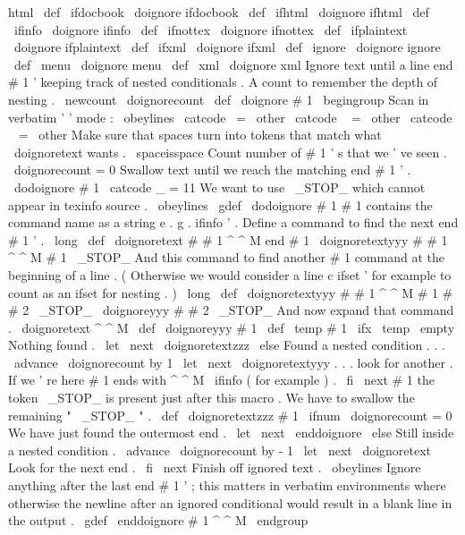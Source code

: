 {{{{{{
html
}
}
\
def
\
ifdocbook
{
\
doignore
{
ifdocbook
}
}
\
def
\
ifhtml
{
\
doignore
{
ifhtml
}
}
\
def
\
ifinfo
{
\
doignore
{
ifinfo
}
}
\
def
\
ifnottex
{
\
doignore
{
ifnottex
}
}
\
def
\
ifplaintext
{
\
doignore
{
ifplaintext
}
}
\
def
\
ifxml
{
\
doignore
{
ifxml
}
}
\
def
\
ignore
{
\
doignore
{
ignore
}
}
\
def
\
menu
{
\
doignore
{
menu
}
}
\
def
\
xml
{
\
doignore
{
xml
}
}
%
Ignore
text
until
a
line
end
#
1
'
keeping
track
of
nested
conditionals
.
%
%
A
count
to
remember
the
depth
of
nesting
.
\
newcount
\
doignorecount
\
def
\
doignore
#
1
{
\
begingroup
%
Scan
in
verbatim
'
'
mode
:
\
obeylines
\
catcode
\
=
\
other
\
catcode
\
{
=
\
other
\
catcode
\
}
=
\
other
%
%
Make
sure
that
spaces
turn
into
tokens
that
match
what
\
doignoretext
wants
.
\
spaceisspace
%
%
Count
number
of
#
1
'
s
that
we
'
ve
seen
.
\
doignorecount
=
0
%
%
Swallow
text
until
we
reach
the
matching
end
#
1
'
.
\
dodoignore
{
#
1
}
%
}
{
\
catcode
_
=
11
%
We
want
to
use
\
_STOP_
which
cannot
appear
in
texinfo
source
.
\
obeylines
%
%
\
gdef
\
dodoignore
#
1
{
%
%
#
1
contains
the
command
name
as
a
string
e
.
g
.
ifinfo
'
.
%
%
Define
a
command
to
find
the
next
end
#
1
'
.
\
long
\
def
\
doignoretext
#
#
1
^
^
M
end
#
1
{
%
\
doignoretextyyy
#
#
1
^
^
M
#
1
\
_STOP_
}
%
%
%
And
this
command
to
find
another
#
1
command
at
the
beginning
of
a
%
line
.
(
Otherwise
we
would
consider
a
line
c
ifset
'
for
%
example
to
count
as
an
ifset
for
nesting
.
)
\
long
\
def
\
doignoretextyyy
#
#
1
^
^
M
#
1
#
#
2
\
_STOP_
{
\
doignoreyyy
{
#
#
2
}
\
_STOP_
}
%
%
%
And
now
expand
that
command
.
\
doignoretext
^
^
M
%
}
%
}
\
def
\
doignoreyyy
#
1
{
%
\
def
\
temp
{
#
1
}
%
\
ifx
\
temp
\
empty
%
Nothing
found
.
\
let
\
next
\
doignoretextzzz
\
else
%
Found
a
nested
condition
.
.
.
\
advance
\
doignorecount
by
1
\
let
\
next
\
doignoretextyyy
%
.
.
.
look
for
another
.
%
If
we
'
re
here
#
1
ends
with
^
^
M
\
ifinfo
(
for
example
)
.
\
fi
\
next
#
1
%
the
token
\
_STOP_
is
present
just
after
this
macro
.
}
%
We
have
to
swallow
the
remaining
"
\
_STOP_
"
.
%
\
def
\
doignoretextzzz
#
1
{
%
\
ifnum
\
doignorecount
=
0
%
We
have
just
found
the
outermost
end
.
\
let
\
next
\
enddoignore
\
else
%
Still
inside
a
nested
condition
.
\
advance
\
doignorecount
by
-
1
\
let
\
next
\
doignoretext
%
Look
for
the
next
end
.
\
fi
\
next
}
%
Finish
off
ignored
text
.
{
\
obeylines
%
%
Ignore
anything
after
the
last
end
#
1
'
;
this
matters
in
verbatim
%
environments
where
otherwise
the
newline
after
an
ignored
conditional
%
would
result
in
a
blank
line
in
the
output
.
\
gdef
\
enddoignore
#
1
^
^
M
{
\
endgroup
}}}}}}
